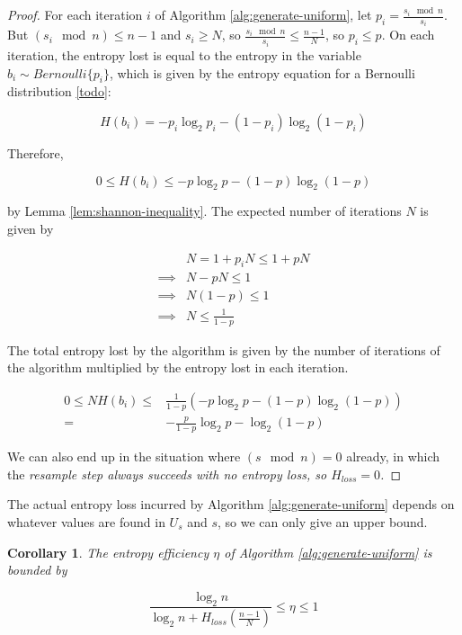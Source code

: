 \documentclass[12pt]{article}
\newtheorem{corollary}{Corollary}
\begin{document}
\begin{proof}
For each iteration $i$ of Algorithm \ref{alg:generate-uniform}, let $p_i = \frac{s_i \mod n}{s_i}$. But $(s_i \mod n) \le n-1$ and $s_i \ge N$, so $\frac{s_i \mod n}{s_i} \le \frac{n-1}{N}$, so $p_i \le p$. On each iteration, the entropy lost is equal to the entropy in the variable $b_i \sim Bernoulli\{p_i\}$, which is given by the entropy equation for a Bernoulli distribution \ref{todo}:

\begin{equation}
H(b_i) = -p_i\log_2p_i - (1-p_i)\log_2(1-p_i)
\end{equation}

Therefore, 

\begin{equation}
0 \le H(b_i) \le -p\log_2p - (1-p)\log_2(1-p) 
\end{equation}


by Lemma \ref{lem:shannon-inequality}. The expected number of iterations $N$ is given by

\begin{align}
& N = 1 + p_iN \le 1 + pN \\
\implies & N-pN \le 1 \\
\implies & N(1-p) \le 1 \\
\implies & N \le \frac{1}{1-p}
\end{align}

The total entropy lost by the algorithm is given by the number of iterations of the algorithm multiplied by the entropy lost in each iteration.

\begin{align}
0 \le NH(b_i) \le & \frac{1}{1-p}(-p\log_2p - (1-p)\log_2(1-p) ) \\
= & -\frac{p}{1-p}\log_2p - \log_2(1-p)
\end{align}

We can also end up in the situation where $(s \mod n) = 0$ already, in which the \em resample \em step always succeeds with no entropy loss, so $H_{loss}=0$.
\end{proof}

The actual entropy loss incurred by Algorithm \ref{alg:generate-uniform} depends on whatever values are found in $U_s$ and $s$, so we can only give an upper bound.

\begin{corollary}
The entropy efficiency $\eta$ of Algorithm \ref{alg:generate-uniform} is bounded by

\begin{equation}
\frac{\log_2n}{\log_2n + H_{loss}(\frac{n-1}{N})} \le \eta \le 1
\label{eq:generate-uniform-efficiency}
\end{equation}
\end{corollary}
\end{document}
